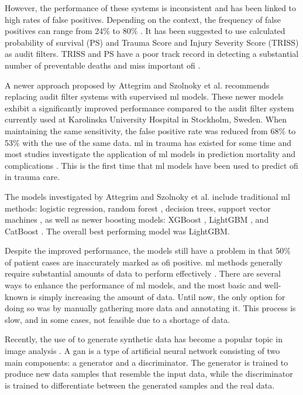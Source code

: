 \documentclass[12pt, a4paper]{article}
\begin{document}
However, the performance of these systems is inconsistent and has been linked to high rates of false positives. Depending on the context, the frequency of false positives can range from 24\% to 80\% \cite{attergrim_predicting_2023,sanddal_analysis_2011,roy_learning_2017,ghorbani_analysis_2018}. It has been suggested to use calculated probability of survival (PS) and Trauma Score and Injury Severity Score (TRISS) as audit filters. TRISS and PS have a poor track record in detecting a substantial number of preventable deaths and miss important \acrshort{ofi} \cite{heim_survival_2016}.

A newer approach proposed by Attegrim and Szolnoky et al. \cite{attergrim_predicting_2023} recommends replacing audit filter systems with supervised \acrfull{ml} models. These newer models exhibit a significantly improved performance compared to the audit filter system currently used at Karolinska University Hospital in Stockholm, Sweden. When maintaining the same sensitivity, the false positive rate was reduced from 68\% to 53\% with the use of the same data. \acrshort{ml} in trauma has existed for some time and most studies investigate the application of \acrshort{ml} models in prediction mortality and complications \cite{zhang_machine_2022}. This is the first time that \acrshort{ml} models have been used to predict \acrshort{ofi} in trauma care.

The models investigated by Attegrim and Szolnoky et al. include traditional \acrshort{ml} methods: logistic regression, random forest \cite{breiman_random_2001}, decision trees, support vector machines \cite{cortes_support-vector_1995}, as well as newer boosting models: XGBoost \cite{chen_xgboost_2016}, LightGBM \cite{ke_lightgbm_2017}, and CatBoost \cite{prokhorenkova_catboost_2018}. The overall best performing model was LightGBM.

Despite the improved performance, the models still have a problem in that 50\% of patient cases are inaccurately marked as \acrshort{ofi} positive. \acrshort{ml} methods generally require substantial amounts of data to perform effectively \cite{piccialli_survey_2021}. There are several ways to enhance the performance of \acrshort{ml} models, and the most basic and well-known is simply increasing the amount of data. Until now, the only option for doing so was by manually gathering more data and annotating it. This process is slow, and in some cases, not feasible due to a shortage of data.

Recently, the use of  to generate synthetic data has become a popular topic in image analysis \cite{pavan_kumar_generative_2021}.  A \acrshort{gan} is a type of artificial neural network consisting of two main components: a generator and a discriminator. The generator is trained to produce new data samples that resemble the input data, while the discriminator is trained to differentiate between the generated samples and the real data.
\end{document}
